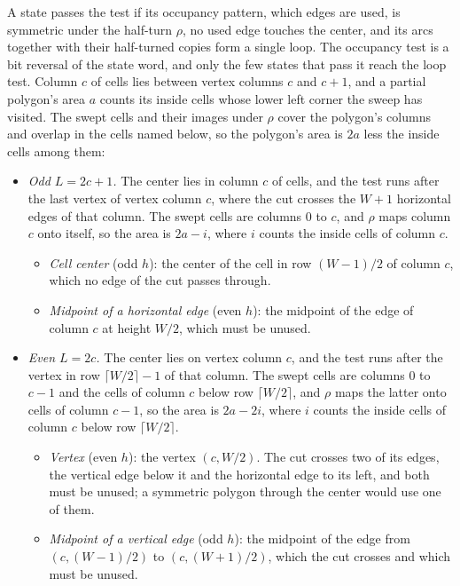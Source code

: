 \documentclass[11pt]{a000104}
\numberwithin{equation}{section}
\begin{document}
A state passes the test if its occupancy pattern, which edges are used, is symmetric under the half-turn $\rho$, no used edge touches the center, and its arcs together with their half-turned copies form a single loop.
The occupancy test is a bit reversal of the state word, and only the few states that pass it reach the loop test.
Column $c$ of cells lies between vertex columns $c$ and $c + 1$, and a partial polygon's area $a$ counts its inside cells whose lower left corner the sweep has visited.
The swept cells and their images under $\rho$ cover the polygon's columns and overlap in the cells named below, so the polygon's area is $2a$ less the inside cells among them:
\begin{itemize}
  \item \emph{Odd $L = 2c + 1$.} The center lies in column $c$ of cells, and the test runs after the last vertex of vertex column $c$, where the cut crosses the $W + 1$ horizontal edges of that column. The swept cells are columns $0$ to $c$, and $\rho$ maps column $c$ onto itself, so the area is $2a - i$, where $i$ counts the inside cells of column $c$.
  \begin{itemize}
    \item \emph{Cell center} (odd $h$): the center of the cell in row $(W - 1)/2$ of column $c$, which no edge of the cut passes through.
    \item \emph{Midpoint of a horizontal edge} (even $h$): the midpoint of the edge of column $c$ at height $W/2$, which must be unused.
  \end{itemize}
  \item \emph{Even $L = 2c$.} The center lies on vertex column $c$, and the test runs after the vertex in row $\lceil W/2 \rceil - 1$ of that column. The swept cells are columns $0$ to $c - 1$ and the cells of column $c$ below row $\lceil W/2 \rceil$, and $\rho$ maps the latter onto cells of column $c - 1$, so the area is $2a - 2i$, where $i$ counts the inside cells of column $c$ below row $\lceil W/2 \rceil$.
  \begin{itemize}
    \item \emph{Vertex} (even $h$): the vertex $(c, W/2)$. The cut crosses two of its edges, the vertical edge below it and the horizontal edge to its left, and both must be unused; a symmetric polygon through the center would use one of them.
    \item \emph{Midpoint of a vertical edge} (odd $h$): the midpoint of the edge from $(c, (W - 1)/2)$ to $(c, (W + 1)/2)$, which the cut crosses and which must be unused.
  \end{itemize}
\end{itemize}
\end{document}
